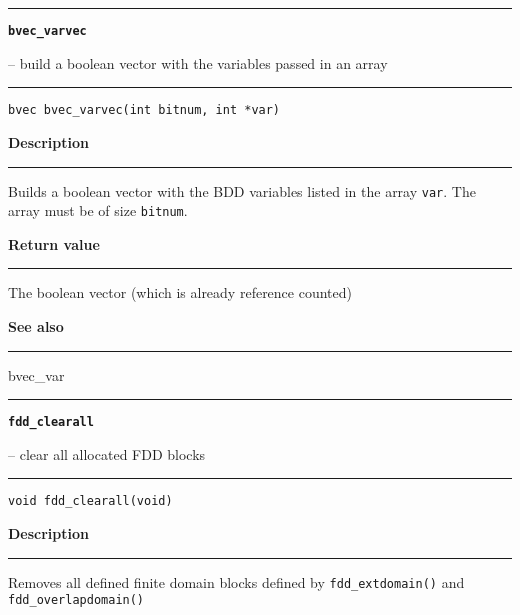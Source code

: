 \begin{minipage}{\textwidth}

\noindent\begin{minipage}{\textwidth}
\rule{\textwidth}{0.5mm}
{\tt\bf bvec\_varvec }
\--- build a boolean vector with the variables passed in an array  \hspace{\fill}
\\\rule[1.5ex]{\textwidth}{0.5mm}
\end{minipage}

\noindent\begin{verbatim}
bvec bvec_varvec(int bitnum, int *var) 
\end{verbatim}

\vspace{\parsep}\noindent
{\bf Description}\\\rule[1.5ex]{\textwidth}{0.2mm}\vspace{-1.5ex}\setlength{\parindent}{1em}
Builds a boolean vector with the BDD variables listed in
           the array {\tt var}. The array must be of size {\tt bitnum}. 

\setlength{\parindent}{0em}\vspace{\parsep}\vspace{\baselineskip}\noindent
{\bf Return value}\\\rule[1.5ex]{\textwidth}{0.2mm}\vspace{-1.5ex}
The boolean vector (which is already reference counted) 

\vspace{\parsep}\vspace{\baselineskip}\noindent
{\bf See also}\\\rule[1.5ex]{\textwidth}{0.2mm}\vspace{-1.5ex}
bvec\_var 
\end{minipage}
\vspace{8ex}
\begin{minipage}{\textwidth}

\noindent\begin{minipage}{\textwidth}
\rule{\textwidth}{0.5mm}
{\tt\bf fdd\_clearall }
\--- clear all allocated FDD blocks  \hspace{\fill}
\\\rule[1.5ex]{\textwidth}{0.5mm}
\end{minipage}

\noindent\begin{verbatim}
void fdd_clearall(void) 
\end{verbatim}

\vspace{\parsep}\noindent
{\bf Description}\\\rule[1.5ex]{\textwidth}{0.2mm}\vspace{-1.5ex}\setlength{\parindent}{1em}
Removes all defined finite domain blocks defined by
           {\tt fdd\_extdomain()} and {\tt fdd\_overlapdomain()} 
\end{minipage}
